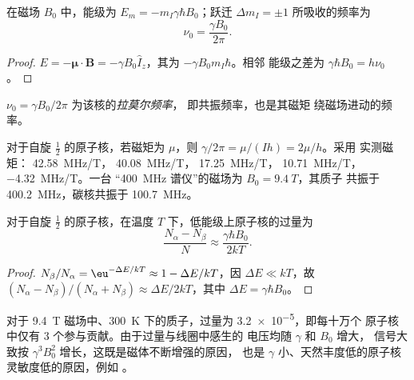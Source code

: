 \begin{proposition}[塞曼能级]\label{prop:b3:advanced-nmr:zeeman}
在磁场 $B_0$ 中，能级为 $E_m = -m_I\gamma\hbar B_0$；跃迁 $\Delta m_I = \pm1$
所吸收的频率为
\[
\nu_0 = \frac{\gamma B_0}{2\pi}.
\]
\end{proposition}

\begin{proof}
$E = -\boldsymbol\mu\cdot\mathbf B = -\gamma B_0\hat I_z$，其为 $-\gamma B_0m_I\hbar$。相邻
能级之差为 $\gamma\hbar B_0 = h\nu_0$。
\end{proof}

\begin{definition}[拉莫尔频率]\label{def:b3:advanced-nmr:larmor}
$\nu_0 = \gamma B_0/2\pi$ 为该核的\emph{拉莫尔频率}，
即共振频率，也是其磁矩
绕磁场进动的频率。
\end{definition}

\begin{example}[常见原子核]\label{ex:b3:advanced-nmr:nuclei}
对于自旋 $\frac12$ 的原子核，若磁矩为 $\mu$，则 $\gamma/2\pi = \mu/(Ih) = 2\mu/h$。采用
实测磁矩： \qty{42.58}{MHz/T}， \qty{40.08}{MHz/T}，
\qty{17.25}{MHz/T}， \qty{10.71}{MHz/T}， \qty{-4.32}{MHz/T}。一台
“\qty{400}{MHz} 谱仪”的磁场为 $B_0 = \qty{9.4}{T}$，其质子
共振于 \qty{400.2}{MHz}，碳核共振于 \qty{100.7}{MHz}。
\end{example}

\begin{proposition}[能级布居的微小差异]\label{prop:b3:advanced-nmr:populations}
对于自旋 $\frac12$ 的原子核，在温度 $T$ 下，低能级上原子核的过量为
\[
\frac{N_\alpha - N_\beta}{N} \approx \frac{\gamma\hbar B_0}{2kT}.
\]
\end{proposition}

\begin{proof}
$N_\beta/N_\alpha = \eu^{-\Delta E/kT} \approx 1 - \Delta E/kT$，因 $\Delta E \ll kT$，故
$(N_\alpha - N_\beta)/(N_\alpha + N_\beta) \approx \Delta E/2kT$，其中 $\Delta E = \gamma\hbar B_0$。
\end{proof}

对于 \qty{9.4}{T} 磁场中、\qty{300}{K} 下的质子，过量为 \num{3.2e-5}，即每十万个
原子核中仅有 3 个参与贡献。由于过量与线圈中感生的
电压均随 $\gamma$ 和 $B_0$ 增大，
信号大致按 $\gamma^3B_0^2$ 增长，这既是磁体不断增强的原因，
也是 $\gamma$ 小、天然丰度低的原子核灵敏度低的原因，例如
。

